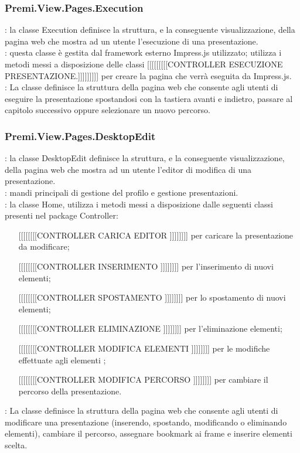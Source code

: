 {		\subsubsection{Premi.View.Pages.Execution}{
			\textbf{\tipo}: la classe Execution definisce la struttura, e la conseguente visualizzazione, della pagina web che mostra ad un utente l'esecuzione di una presentazione.\\
			\textbf{\relaz}: questa classe è gestita dal framework esterno Impress.js utilizzato; utilizza i metodi messi a disposizione delle classi [[[[[[[[[CONTROLLER ESECUZIONE PRESENTAZIONE.]]]]]]]]] per creare la pagina che verrà eseguita da Impress.js.\\
			\textbf{\attivita}: La classe definisce la struttura della pagina web che consente agli utenti di eseguire la presentazione spostandosi con la tastiera avanti e indietro, passare al capitolo successivo oppure selezionare un nuovo percorso.\\
		}
		\subsubsection{Premi.View.Pages.DesktopEdit}{
			\textbf{\tipo}: la classe DesktopEdit definisce la struttura, e la conseguente visualizzazione, della pagina web che mostra ad un utente l'editor di modifica di una presentazione.\\
			\textbf{\relaz}: mandi principali di gestione del profilo e gestione presentazioni.\\	
			\textbf{\relaz}: la classe Home, utilizza i metodi messi a disposizione dalle seguenti classi presenti nel package Controller:
			\begin{itemize}
				\item [[[[[[[[[CONTROLLER CARICA EDITOR]]]]]]]]] per caricare la presentazione da modificare;
				\item [[[[[[[[[CONTROLLER INSERIMENTO]]]]]]]]] per l'inserimento di nuovi elementi;
				\item [[[[[[[[[CONTROLLER SPOSTAMENTO]]]]]]]]] per lo spostamento di nuovi elementi;
				\item [[[[[[[[[CONTROLLER ELIMINAZIONE]]]]]]]]] per l'eliminazione elementi;
				\item [[[[[[[[[CONTROLLER MODIFICA ELEMENTI]]]]]]]]] per le modifiche  effettuate agli elementi ;
				\item [[[[[[[[[CONTROLLER MODIFICA PERCORSO]]]]]]]]] per cambiare il percorso della presentazione.
			\end{itemize}
			\textbf{\attivita}: La classe definisce la struttura della pagina web che consente agli utenti di modificare una presentazione (inserendo, spostando, modificando o eliminando elementi), cambiare il percorso, assegnare bookmark ai frame e inserire elementi scelta.\\
		}
}
